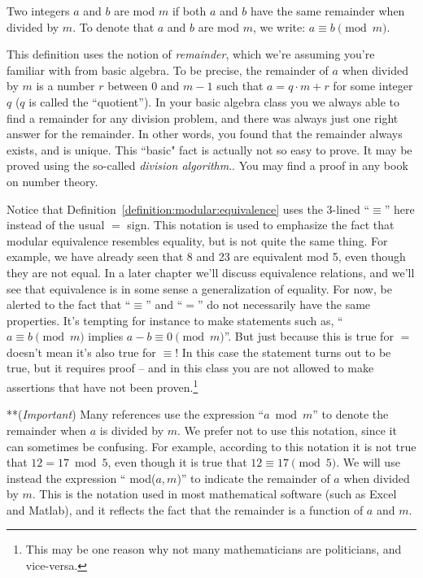 \begin{defn}\label{definition:modular:equivalence}
 Two integers $a$ and $b$ are  mod $m$  if both $a$ and $b$ have the same remainder when divided by $m$. To denote that $a$ and $b$ are  mod $m$, we write: $a \equiv b \pmod{m}$.
 \end{defn}

\begin{rem}
This definition uses the notion of \emph{remainder}, which we're assuming you're familiar with from  basic algebra. To be precise, the remainder of $a$ when divided by $m$ is a number $r$ between $0$ and $m-1$ such that  $a = q \cdot m + r$ for some integer $q$ ($q$ is called the ``quotient'').  In your basic algebra class you we always able to find a remainder for any division problem, and there was always just one right answer for the remainder. In other words, you found that the remainder always exists, and is unique. This ``basic" fact is actually not so easy to prove. It may be proved using the so-called \emph{division algorithm}.. You may find a proof in any book on number theory.
\end{rem}

\begin{rem}
Notice that Definition~\ref{definition:modular:equivalence} uses the 3-lined ``$\equiv$'' here instead of the usual $=$ sign. This notation is used  to emphasize the fact that modular equivalence resembles equality, but is not quite the same thing.  For example, we have already seen that 8 and 23 are equivalent mod 5, even though they are not equal.  In a later chapter we'll discuss equivalence relations, and we'll see that equivalence is in some sense a generalization of equality. For now,  be alerted to the fact that ``$\equiv$'' and ``$=$'' do not necessarily have the same properties. It's tempting for instance to make statements such as, ``$a \equiv b \pmod{m}$ implies $a-b \equiv 0 \pmod{m}$''. But just because this is true for $=$ doesn't mean it's also true for $\equiv$!  In this case the statement turns out to be true, but it requires proof -- and in this class you are not allowed to make assertions that have not been proven.\footnote{This may be one reason why not many mathematicians are politicians, and vice-versa.}  
\end{rem}

\begin{rem}
**(\emph{Important}) Many references use the expression ``$a \bmod m$'' to denote the remainder when $a$ is divided by $m$.  We prefer not to use this notation, since it can sometimes be confusing.  For example, according to this notation it is not true that $12 = 17 \bmod 5$, even though it is true that $12 \equiv 17 \pmod{5}$.   We will use instead the expression `` mod($a,m$)'' to indicate the remainder of $a$ when divided by $m$.  This is the notation used in most mathematical software (such as Excel and Matlab), and it reflects the fact that the remainder is a function of $a$ and $m$. 
\end{rem}

